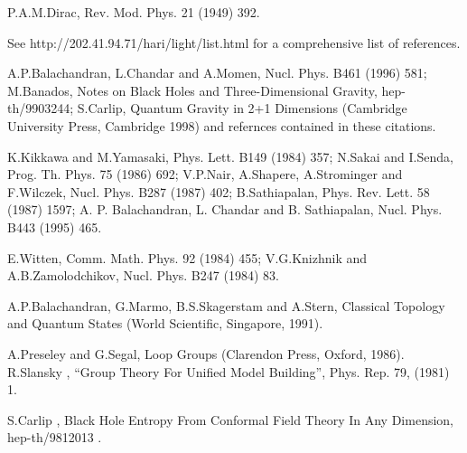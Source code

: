 \documentclass[a4paper,12pt]{article}
\begin{document}
\newpage


\begin{thebibliography}{99}

 P.A.M.Dirac, Rev. Mod. Phys. 21 (1949) 392.

 See http://202.41.94.71/\myHighlight{$\sim$}\coordHE{}hari/light/list.html for a
comprehensive list of references.

A.P.Balachandran, L.Chandar and A.Momen, Nucl. Phys. B461 (1996) 581; 
M.Banados, Notes on Black Holes and Three-Dimensional Gravity, hep-th/9903244; 
S.Carlip, Quantum Gravity in 2+1 Dimensions (Cambridge University
Press, Cambridge 1998) and refernces contained in these citations.

K.Kikkawa and M.Yamasaki, Phys. Lett. B149 (1984) 357;
N.Sakai and I.Senda, Prog. Th. Phys. 75 (1986) 692;
V.P.Nair, A.Shapere, A.Strominger and F.Wilczek, Nucl. Phys. 
B287 (1987) 402; B.Sathiapalan, Phys. Rev. Lett. 58 (1987) 1597;
A. P. Balachandran, L. Chandar and B. Sathiapalan, Nucl. Phys. B443 
(1995) 465.

 E.Witten, Comm. Math. Phys. 92 (1984) 455;
V.G.Knizhnik and A.B.Zamolodchikov, Nucl. Phys. B247 (1984) 83.

 A.P.Balachandran, G.Marmo, B.S.Skagerstam and A.Stern,
Classical Topology and Quantum States (World Scientific, Singapore, 1991).

 A.Preseley and G.Segal, Loop Groups (Clarendon
Press, Oxford, 1986).
R.Slansky , ``Group Theory For
 Unified Model Building'', Phys. Rep. 79, (1981) 1.

 S.Carlip , Black Hole Entropy From Conformal Field Theory
 In Any Dimension, hep-th/9812013 .
\end{thebibliography}
\end{document}
